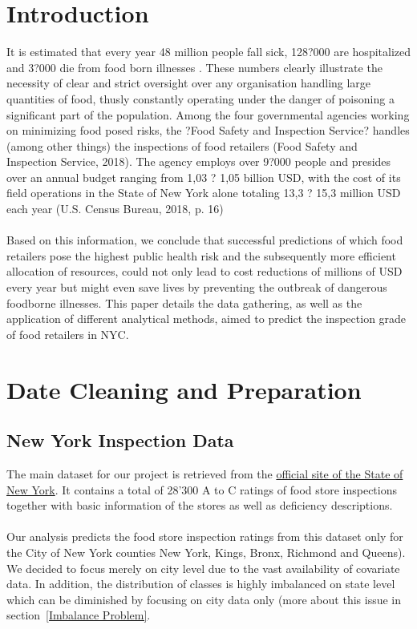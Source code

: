\documentclass[11pt]{article}
\begin{document}


\section{Introduction}
It is estimated that every year 48 million people fall sick, 128?000 are hospitalized and 3?000 die from food born illnesses \citep{Disease}. These numbers clearly illustrate the necessity of clear and strict oversight over any organisation handling large quantities of food, thusly constantly operating under the danger of poisoning a significant part of the population. Among the four governmental agencies working on minimizing food posed risks, the ?Food Safety and Inspection Service? handles (among other things) the inspections of food retailers (Food Safety and Inspection Service, 2018). The agency employs over 9?000 people and presides over an annual budget ranging from 1,03 ? 1,05 billion USD, with the cost of its field operations in the State of New York alone totaling 13,3 ? 15,3 million USD each year (U.S. Census Bureau, 2018, p. 16)\\
\\
Based on this information, we conclude that successful predictions of which food retailers pose the highest public health risk and the subsequently more efficient allocation of resources, could not only lead to cost reductions of millions of USD every year but might even save lives by preventing the outbreak of dangerous foodborne illnesses. This paper details the data gathering, as well as the application of different analytical methods, aimed to predict the inspection grade of food retailers in NYC.

\section{Date Cleaning and Preparation}

\subsection{New York Inspection Data}

The main dataset for our project is retrieved from the \href{https://data.ny.gov/Economic-Development/Retail-Food-Store-Inspections-Current-Ratings/d6dy-3h7r}{official site of the State of New York}. It contains a total of 28'300 A to C ratings of food store inspections together with basic information of the stores as well as deficiency descriptions.\\
\\
Our analysis predicts the food store inspection ratings from this dataset only for the City of New York counties New York, Kings, Bronx, Richmond and Queens). We decided to focus merely on city level due to the vast availability of covariate data. In addition, the distribution of classes is highly imbalanced on state level which can be diminished by focusing on city data only (more about this issue in section~\ref{Imbalance Problem}.
\end{document}

